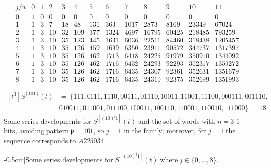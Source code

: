 \begin{table}
\begin{equation*}
\begin{array}{c|cccccccccccc}
    j/n & 0 & 1 & 2 & 3 & 4 & 5 & 6 & 7 & 8 & 9 & 10 & 11\\\hline0 & 1 & 0 & 0 & 0 & 0 & 0 & 0 & 0 & 0 & 0 & 0 & 0\\1 & 1 & 3 & 7 & 18 & 48 & 131 & 363 & 1017 & 2873 & 8169 & 23349 & 67024\\2 & 1 & 3 & 10 & 32 & 109 & 377 & 1324 & 4697 & 16795 & 60425 & 218485 & 793259\\3 & 1 & 3 & 10 & 35 & 123 & 445 & 1631 & 6036 & 22511 & 84460 & 318438 & 1205457\\4 & 1 & 3 & 10 & 35 & 126 & 459 & 1699 & 6350 & 23911 & 90572 & 344737 & 1317397\\5 & 1 & 3 & 10 & 35 & 126 & 462 & 1713 & 6418 & 24225 & 91979 & 350910 & 1344092\\6 & 1 & 3 & 10 & 35 & 126 & 462 & 1716 & 6432 & 24293 & 92293 & 352317 & 1350272\\7 & 1 & 3 & 10 & 35 & 126 & 462 & 1716 & 6435 & 24307 & 92361 & 352631 & 1351679\\8 & 1 & 3 & 10 & 35 & 126 & 462 & 1716 & 6435 & 24310 & 92375 & 352699 & 1351993
\end{array}
\end{equation*}

\begin{displaymath}
    \begin{split}
    [t^{3}]S^{[101]}(t) &= \big|\lbrace 111, 0111, 1110, 00111, 01110, 10011, 11001, 11100, 000111, 001110,\\
    & 010011, 011001, 011100, 100011, 100110, 110001, 110010, 111000 \rbrace\big| = 18
    \end{split}
\end{displaymath}
{Some series developments for $S^{[(10)^{j}1]}(t)$ and the set of words with
$n=3$ $1$-bits, avoiding pattern $\mathfrak{p}=101$, so $j=1$ in the family;
moreover, for $j=1$ the sequence corresponds to $A225034$.}
\caption[][-0.5cm]{Some series developments for $S^{[(10)^{j}1]}(t)$ where
$j\in \lbrace 0,\ldots,8 \rbrace$.}
\label{tbl:S10_j:1}
\end{table}


